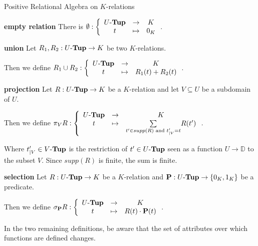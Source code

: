 \documentclass[11pt]{beamer}
\newcommand{\utup}{\text{$U$-\textbf{Tup}}}
\newcommand{\bb}[1]{\mathbb{#1}}
\begin{document}
\begin{frame}[allowframebreaks]{Positive Relational Algebra on $K$-relations}

\begin{list}{}{}
		
			\item[\textbf{empty relation}] There is $\emptyset : \left\lbrace 
			\begin{array}{c c c}
			\utup & \to & K \\
			t & \mapsto & 0_K
			\end{array}
			  \right.$.
		
			\item[\textbf{union}] Let $R_1,R_2 : \utup \to K$ be two $K$-relations.
			
			Then we define $R_1 \cup R_2 : 
			\left\lbrace 
			\begin{array}{c c c}
			\text{$U$-\textbf{Tup}} & \to & K \\
			t & \mapsto & R_1(t) + R_2(t)
			\end{array}
			  \right.$.
			  
			 \item[\textbf{projection}] Let $R : \utup \to K$ be a $K$-relation and let $V \subseteq U$ be a subdomain of $U$.
			 
			Then we define $\pi_VR: 
			\left\lbrace 
			\begin{array}{c c c}
			\text{$U$-\textbf{Tup}} & \to & K \\
			t & \mapsto & \underset{t' \in supp(R) \text{ and } t'_{|V}=t}{\sum} R(t')
			\end{array}
			  \right.$.
			  
			 Where $t'_{|V} \in \text{$V$-\textbf{Tup}}$ is the restriction of $t' \in \utup$ seen as a function $U \to \bb{D}$ to the subset $V$. Since $supp(R)$ is finite, the sum is finite.
		
			\item[\textbf{selection}] Let $R : \utup \to K$ be a $K$-relation and $\textbf{P} : \utup \to \{0_K,1_K\}$ be a predicate.
			
			Then we define $\sigma_{\textbf{P}} R: 
			\left\lbrace 
			\begin{array}{c c c}
			\text{$U$-\textbf{Tup}} & \to & K \\
			t & \mapsto & R(t) \cdot \textbf{P}(t)
			\end{array}
			  \right.$.
			  
			 \item In the two remaining definitions, be aware that the set of attributes over which functions are defined changes. 
			  

\end{list}
\end{frame}
\end{document}

